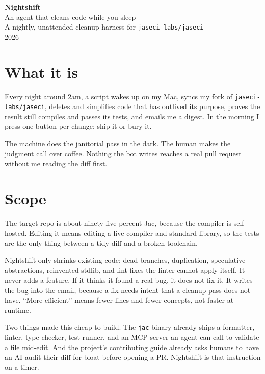 \documentclass[11pt]{article}
\newcommand{\code}[1]{{\color{night}\texttt{#1}}}
\begin{document}
\begin{center}
  {\sffamily\bfseries\color{night}\fontsize{30}{34}\selectfont Nightshift}\\[6pt]
  {\sffamily\large\color{accent} An agent that cleans code while you sleep}\\[10pt]
  {\color{slate}\small A nightly, unattended cleanup harness for \texttt{jaseci-labs/jaseci}}\\[4pt]
  {\color{slate}\small 2026}
\end{center}
\vspace{1.4em}

\section*{What it is}

Every night around 2am, a script wakes up on my Mac, syncs my fork of
\code{jaseci-labs/jaseci}, deletes and simplifies code that has outlived its
purpose, proves the result still compiles and passes its tests, and emails me a
digest. In the morning I press one button per change: ship it or bury it.

The machine does the janitorial pass in the dark. The human makes the judgment
call over coffee. Nothing the bot writes reaches a real pull request without me
reading the diff first.

\section{Scope}

The target repo is about ninety-five percent Jac, because the compiler is
self-hosted. Editing it means editing a live compiler and standard library, so
the tests are the only thing between a tidy diff and a broken toolchain.

Nightshift only shrinks existing code: dead branches, duplication, speculative
abstractions, reinvented stdlib, and lint fixes the linter cannot apply itself.
It never adds a feature. If it thinks it found a real bug, it does not fix it. It
writes the bug into the email, because a fix needs intent that a cleanup pass does not
have. ``More efficient'' means fewer lines and fewer concepts, not faster at
runtime.

Two things made this cheap to build. The \code{jac} binary already ships a
formatter, linter, type checker, test runner, and an MCP server an agent can call
to validate a file mid-edit. And the project's contributing guide already asks
humans to have an AI audit their diff for bloat before opening a PR. Nightshift is
that instruction on a timer.
\end{document}
